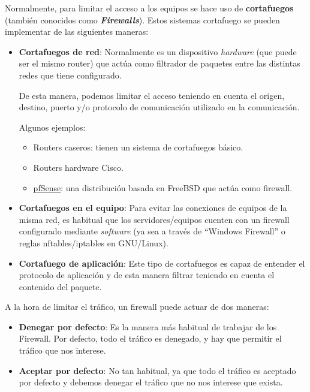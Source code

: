 Normalmente, para limitar el acceso a los equipos se hace uso de \textbf{cortafuegos} (también conocidos como \textbf{\textit{Firewalls}}). Estos sistemas cortafuego se pueden implementar de las siguientes maneras:

\begin{itemize}
    \item \textbf{Cortafuegos de red}: Normalmente es un dispositivo \textit{hardware} (que puede ser el mismo router) que actúa como filtrador de paquetes entre las distintas redes que tiene configurado.

    De esta manera, podemos limitar el acceso teniendo en cuenta el origen, destino, puerto y/o protocolo de comunicación utilizado en la comunicación.

    Algunos ejemplos:
    \begin{itemize}
        \item Routers caseros: tienen un sistema de cortafuegos básico.
        \item Routers hardware Cisco.
        \item \hyperlink{pfsense}{pfSense}: una distribución basada en FreeBSD que actúa como firewall.
    \end{itemize}

    \item \textbf{Cortafuegos en el equipo}: Para evitar las conexiones de equipos de la misma red, es habitual que los servidores/equipos cuenten con un firewall configurado mediante \textit{software} (ya sea a través de “Windows Firewall” o reglas nftables/iptables en GNU/Linux).

    \item \textbf{Cortafuego de aplicación}: Este tipo de cortafuegos es capaz de entender el protocolo de aplicación y de esta manera filtrar teniendo en cuenta el contenido del paquete.
\end{itemize}

A la hora de limitar el tráfico, un firewall puede actuar de dos maneras:
\begin{itemize}
    \item \textbf{Denegar por defecto}: Es la manera más habitual de trabajar de los Firewall. Por defecto, todo el tráfico es denegado, y hay que permitir el tráfico que nos interese.

    \item \textbf{Aceptar por defecto}: No tan habitual, ya que todo el tráfico es aceptado por defecto y debemos denegar el tráfico que no nos interese que exista.
\end{itemize}


